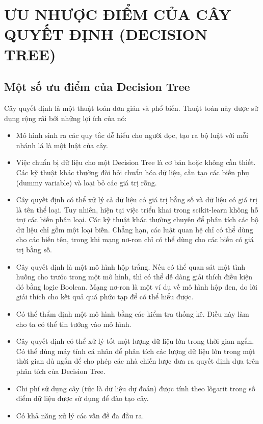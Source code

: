 \chapter{ƯU NHƯỢC ĐIỂM CỦA CÂY QUYẾT ĐỊNH (DECISION TREE)}

\section{Một số ưu điểm của Decision Tree}
Cây quyết định là một thuật toán đơn giản và phổ biến.
Thuật toán này được sử dụng rộng rãi bới những lợi ích của nó:

\begin{itemize}
    \item Mô hình sinh ra các quy tắc dễ hiểu cho người đọc,
    tạo ra bộ luật với mỗi nhánh lá là một luật của cây.
    \item Việc chuẩn bị dữ liệu cho một Decision Tree là cơ bản
    hoặc không cần thiết. Các kỹ thuật khác thường đòi hỏi chuẩn hóa dữ liệu,
    cần tạo các biến phụ (dummy variable) và loại bỏ các giá trị rỗng.
    \item Cây quyết định có thể xử lý cả dữ liệu có giá trị bằng số và
    dữ liệu có giá trị là tên thể loại. Tuy nhiên, hiện tại việc triển khai
    trong scikit-learn không hỗ trợ các biến phân loại. Các kỹ thuật khác
    thường chuyên để phân tích các bộ dữ liệu chỉ gồm một loại biến.
    Chẳng hạn, các luật quan hệ chỉ có thể dùng cho các biến tên,
    trong khi mạng nơ-ron chỉ có thể dùng cho các biến có giá trị bằng số.
    \item Cây quyết định là một mô hình hộp trắng. Nếu có thể quan sát
    một tình huống cho trước trong một mô hình, thì có thể dễ dàng giải thích
    điều kiện đó bằng logic Boolean. Mạng nơ-ron là một ví dụ về mô hình hộp đen,
    do lời giải thích cho kết quả quá phức tạp để có thể hiểu được.
    \item Có thể thẩm định một mô hình bằng các kiểm tra thống kê.
    Điều này làm cho ta có thể tin tưởng vào mô hình.
    \item Cây quyết định có thể xử lý tốt một lượng dữ liệu lớn trong
    thời gian ngắn. Có thể dùng máy tính cá nhân để phân tích các lượng
    dữ liệu lớn trong một thời gian đủ ngắn để cho phép các nhà chiến lược
    đưa ra quyết định dựa trên phân tích của Decision Tree.
    \item Chi phí sử dụng cây (tức là dữ liệu dự đoán) được tính theo lôgarit
    trong số điểm dữ liệu được sử dụng để đào tạo cây.
    \item Có khả năng xử lý các vấn đề đa đầu ra.
\end{itemize}

